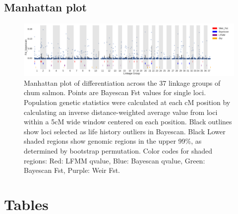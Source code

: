 \documentclass[12pt, one column]{article}
\begin{document}
\begin{landscape}
\subsection*{Manhattan plot}
\begin{figure}[H]
\includegraphics[scale=.25]{figures/Bayescan_Fst_and_bootstrap.png}
\caption[Manhattan plot]{Manhattan plot of differentiation across the 37 linkage groups of chum salmon.  Points are Bayescan Fst values for single loci. Population genetic statistics were calculated at each cM position by calculating an inverse distance-weighted average value from loci within a 5cM wide window centered on each position.  Black outlines show loci selected as life history outliers in Bayescan. Black Lower shaded regions show genomic regions in the upper 99\%, as determined by bootstrap permutation. Color codes for shaded regions: Red: LFMM qvalue, Blue: Bayescan qvalue, Green: Bayescan Fst, Purple: Weir Fst.}
\end{figure}
\end{landscape}
\section*{Tables}
\end{document}
